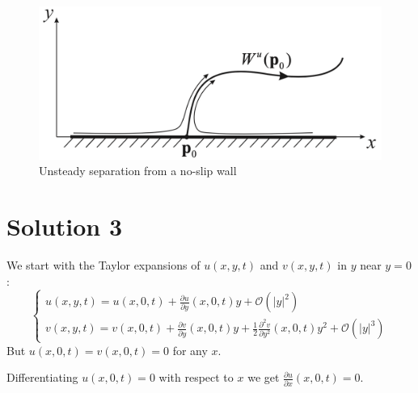 \documentclass[twoside,10pt,a4paper]{article}
\begin{document}
\begin{figure}[H]
	\centering
	\includegraphics[scale=0.15]{Graphics/Q03D01.png}
	\caption{Unsteady separation from a no-slip wall}
\end{figure}

\section*{Solution 3}
We start with the Taylor expansions of $u(x,y,t)$ and $v(x,y,t)$ in $y$ near $y=0$:
\begin{equation}\label{S05E031}
	\begin{cases}
		\displaystyle u(x,y,t) = u(x,0,t) + \frac{\partial u}{\partial y}(x,0,t)y + \mathcal{O}(|y|^2) \\
		\displaystyle v(x,y,t) = v(x,0,t) + \frac{\partial v}{\partial y}(x,0,t)y + \frac{1}{2} \frac{\partial^2 v}{\partial y^2}(x,0,t)y^2 + \mathcal{O}(|y|^3)
	\end{cases}
\end{equation}
But $u(x,0,t) = v(x,0,t) = 0$ for any $x$.

Differentiating $u(x,0,t) = 0$ with respect to $x$ we get $\displaystyle \frac{\partial u}{\partial x}(x,0,t) = 0$.
\end{document}
